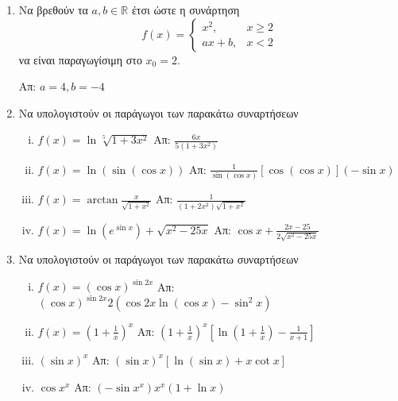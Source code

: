 


\everymath{\displaystyle}



\begin{center}
\end{center}

\vspace{\baselineskip}

\begin{enumerate}


	\item Να βρεθούν τα $ a, b \in \mathbb{R} $ έτσι ώστε η συνάρτηση 
		\[
			f(x) = \begin{cases}
				x^{2}, & x\geq 2 \\
				ax+b , & x<2
			\end{cases}
		\]
		να είναι παραγωγίσιμη στο $ x_{0} = 2 $.

		\hfill Απ: $ a=4, b=-4 $



	\item Να υπολογιστούν οι παράγωγοι των παρακάτω συναρτήσεων
		\begin{enumerate}[(i)]
			\item $ f(x) = \ln{\sqrt[5]{1+3x^{2}}} $ \hfill Απ: $
				\frac{6x}{5(1+3x^{2})} $
			\item $ f(x) = \ln({\sin({\cos{x}})}) $ \hfill Απ: $
				\frac{1}{\sin{(\cos{x})}} [\cos{(\cos{x})}] (- \sin{x}) $ 
			\item $ f(x) = \arctan \frac{x}{\sqrt{1 + x^{2}}} $ \hfill Απ: $
			\frac{1}{(1+2x^{2})\sqrt{1 + x^{2}}} $
			\item $ f(x) = \ln{(e^{\sin{x}})} + \sqrt{x^{2} - 25x} $ \hfill Απ: $
				\cos{x} + \frac{2x - 25}{2 \sqrt{x^{2} - 25x}}  $  
		\end{enumerate}

	\item  Να υπολογιστούν οι παράγωγοι των παρακάτω συναρτήσεων

	\begin{enumerate}[(i)]
		\item $ f(x) = (\cos{x})^{\sin{2x}} $ \hfill Απ: $
			(\cos{x})^{\sin{2x}} 2(\cos{2x} \ln{(\cos{x})} - \sin^{2}{x}) $
			\item $ f(x) = \left(1 + \frac{1}{x} \right)^{x} $ \hfill Απ: $
				\left(1 + \frac{1}{x}\right)^{x}\left[\ln{(1 + \frac{1}{x})} -
				\frac{1}{x+1}\right] $
			\item $ (\sin{x})^{x} $ \hfill Απ: $ (\sin{x})^{x}[\ln{(\sin{x}
				)} + x \cot{x}] $ 
			\item $ \cos{x}^{x} $ \hfill Απ: $ (- \sin{x^{x}})x^{x} (1 +
				\ln{x}) $
	\end{enumerate}


\end{enumerate}
